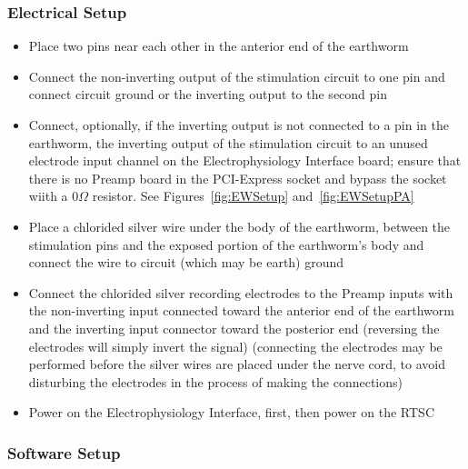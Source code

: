 \subsubsection{Electrical Setup}

\begin{itemize}

\item Place two pins near each other in the anterior end of the earthworm

\item Connect the non-inverting output of the stimulation circuit to one pin and connect circuit ground or the inverting output to the second pin

\item Connect, optionally, if the inverting output is not connected to a pin in the earthworm, the inverting output of the stimulation circuit to an unused electrode input channel on the Electrophysiology Interface board; ensure that there is no Preamp board in the PCI-Express socket and bypass the socket wiith a $0\Omega$ resistor.  See Figures~\ref{fig:EWSetup} and~\ref{fig:EWSetupPA}  

\item Place a chlorided silver wire under the body of the earthworm, between the stimulation pins and the exposed portion of the earthworm's body and connect the wire to circuit (which may be earth) ground

\item Connect the chlorided silver recording electrodes to the Preamp inputs with the non-inverting input connected toward the anterior end of the earthworm and the inverting input connector toward the posterior end (reversing the electrodes will simply invert the signal) (connecting the electrodes may be performed before the silver wires are placed under the nerve cord, to avoid disturbing the electrodes in the process of making the connections)

\item Power on the Electrophysiology Interface, first, then power on the RTSC

\end{itemize}

\subsubsection{Software Setup}

